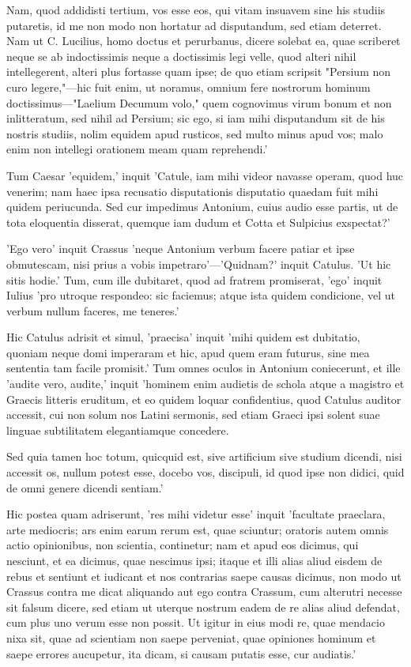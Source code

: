  Nam, quod addidisti tertium, vos esse eos, qui vitam insuavem sine his studiis putaretis, id me non modo non hortatur ad disputandum, sed etiam deterret. Nam ut C. Lucilius, homo doctus et perurbanus, dicere solebat ea, quae scriberet neque se ab indoctissimis neque a doctissimis legi velle, quod alteri nihil intellegerent, alteri plus fortasse quam ipse; de quo etiam scripsit "Persium non curo legere,"—hic fuit enim, ut noramus, omnium fere nostrorum hominum doctissimus—"Laelium Decumum volo," quem cognovimus virum bonum et non inlitteratum, sed nihil ad Persium; sic ego, si iam mihi disputandum sit de his nostris studiis, nolim equidem apud rusticos, sed multo minus apud vos; malo enim non intellegi orationem meam quam reprehendi.'

 Tum Caesar 'equidem,' inquit 'Catule, iam mihi videor navasse operam, quod huc venerim; nam haec ipsa recusatio disputationis disputatio quaedam fuit mihi quidem periucunda. Sed cur impedimus Antonium, cuius audio esse partis, ut de tota eloquentia disserat, quemque iam dudum et Cotta et Sulpicius exspectat?'

 'Ego vero' inquit Crassus 'neque Antonium verbum facere patiar et ipse obmutescam, nisi prius a vobis impetraro'—'Quidnam?' inquit Catulus. 'Ut hic sitis hodie.' Tum, cum ille dubitaret, quod ad fratrem promiserat, 'ego' inquit Iulius 'pro utroque respondeo: sic faciemus; atque ista quidem condicione, vel ut verbum nullum faceres, me teneres.'

 Hic Catulus adrisit et simul, 'praecisa' inquit 'mihi quidem est dubitatio, quoniam neque domi imperaram et hic, apud quem eram futurus, sine mea sententia tam facile promisit.' Tum omnes oculos in Antonium coniecerunt, et ille 'audite vero, audite,' inquit 'hominem enim audietis de schola atque a magistro et Graecis litteris eruditum, et eo quidem loquar confidentius, quod Catulus auditor accessit, cui non solum nos Latini sermonis, sed etiam Graeci ipsi solent suae linguae subtilitatem elegantiamque concedere.

 Sed quia tamen hoc totum, quicquid est, sive artificium sive studium dicendi, nisi accessit os, nullum potest esse, docebo vos, discipuli, id quod ipse non didici, quid de omni genere dicendi sentiam.'

 Hic postea quam adriserunt, 'res mihi videtur esse' inquit 'facultate praeclara, arte mediocris; ars enim earum rerum est, quae sciuntur; oratoris autem omnis actio opinionibus, non scientia, continetur; nam et apud eos dicimus, qui nesciunt, et ea dicimus, quae nescimus ipsi; itaque et illi alias aliud eisdem de rebus et sentiunt et iudicant et nos contrarias saepe causas dicimus, non modo ut Crassus contra me dicat aliquando aut ego contra Crassum, cum alterutri necesse sit falsum dicere, sed etiam ut uterque nostrum eadem de re alias aliud defendat, cum plus uno verum esse non possit. Ut igitur in eius modi re, quae mendacio nixa sit, quae ad scientiam non saepe perveniat, quae opiniones hominum et saepe errores aucupetur, ita dicam, si causam putatis esse, cur audiatis.'


